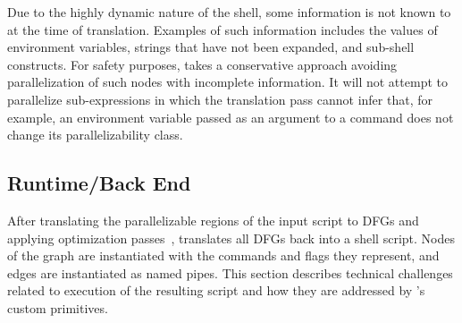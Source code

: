 \documentclass[letterpaper,twocolumn,10pt]{article}
\newcommand{\todo}[1]{\hl{#1}\xspace}
\newcommand{\kk}[1]{[{\color{magenta}kk: #1}]}
\begin{document}
Due to the highly dynamic nature of the shell, some information is not known to \sys at the time of translation.
Examples of such information includes the values of environment variables, strings that have not been expanded, and sub-shell constructs.
For safety purposes, \sys takes a conservative approach avoiding parallelization of such nodes with incomplete information.
It will not attempt to parallelize sub-expressions in which the translation pass cannot infer that, for example, an environment variable passed as an argument to a command does not change its parallelizability class.



\subsection{Runtime/Back End}
\label{optimizer}


After translating the parallelizable regions of the input script to DFGs and applying optimization passes~,
  \sys translates all DFGs back into a shell script.
Nodes of the graph are instantiated with the commands and flags they represent, and edges are instantiated as named pipes.
This section describes technical challenges related to execution of the resulting script and how they are addressed by \sys's custom primitives.


\end{document}
